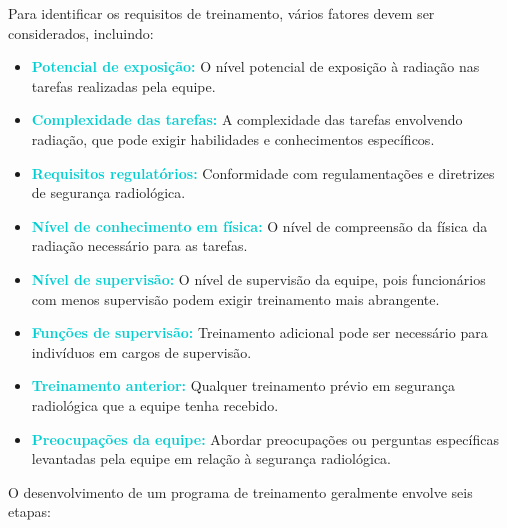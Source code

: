 \documentclass[11pt,a4paper]{article}
\begin{document}
	Para identificar os requisitos de treinamento, vários fatores devem ser considerados, incluindo:

	\begin{itemize}
		\item \textcolor{DarkTurquoise}{\textbf{Potencial de exposição:}} O nível potencial de exposição à radiação nas tarefas realizadas pela equipe.
		
		\item \textcolor{DarkTurquoise}{\textbf{Complexidade das tarefas:}} A complexidade das tarefas envolvendo radiação, que pode exigir habilidades e conhecimentos específicos.
		
		\item \textcolor{DarkTurquoise}{\textbf{Requisitos regulatórios:}} Conformidade com regulamentações e diretrizes de segurança radiológica.
		
		\item \textcolor{DarkTurquoise}{\textbf{Nível de conhecimento em física:}} O nível de compreensão da física da radiação necessário para as tarefas.
		
		\item \textcolor{DarkTurquoise}{\textbf{Nível de supervisão:}} O nível de supervisão da equipe, pois funcionários com menos supervisão podem exigir treinamento mais abrangente.
		
		\item \textcolor{DarkTurquoise}{\textbf{Funções de supervisão:}} Treinamento adicional pode ser necessário para indivíduos em cargos de supervisão.
		
		\item \textcolor{DarkTurquoise}{\textbf{Treinamento anterior:}} Qualquer treinamento prévio em segurança radiológica que a equipe tenha recebido.
		
		\item \textcolor{DarkTurquoise}{\textbf{Preocupações da equipe:}} Abordar preocupações ou perguntas específicas levantadas pela equipe em relação à segurança radiológica.
	\end{itemize}

O desenvolvimento de um programa de treinamento geralmente envolve seis etapas:
\end{document}
